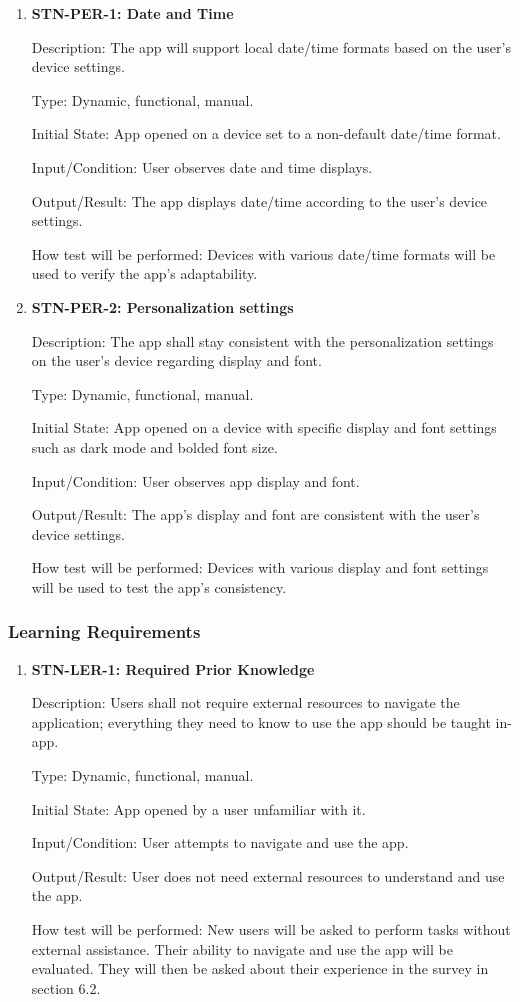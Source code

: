 \documentclass[12pt, titlepage]{article}
\begin{document}
\begin{enumerate}

\item {\textbf{STN-PER-1: Date and Time}}

Description: The app will support local date/time formats based on the user’s device settings.

Type: Dynamic, functional, manual.

Initial State: App opened on a device set to a non-default date/time format.

Input/Condition: User observes date and time displays.

Output/Result: The app displays date/time according to the user's device settings.

How test will be performed: Devices with various date/time formats will be used to verify the app's adaptability.


\item{\textbf{STN-PER-2: Personalization settings}}

Description: The app shall stay consistent with the personalization settings on the user’s device regarding display and font.

Type: Dynamic, functional, manual.

Initial State: App opened on a device with specific display and font settings such as dark mode and bolded font size.

Input/Condition: User observes app display and font.

Output/Result: The app's display and font are consistent with the user’s device settings.

How test will be performed: Devices with various display and font settings will be used to test the app's consistency.

\end{enumerate}

\subsubsection{Learning Requirements}

\begin{enumerate}

\item {\textbf{STN-LER-1: Required Prior Knowledge}}

Description: Users shall not require external resources to navigate the application; everything they need to know to use the app should be taught in-app.

Type: Dynamic, functional, manual.

Initial State: App opened by a user unfamiliar with it.

Input/Condition: User attempts to navigate and use the app.

Output/Result: User does not need external resources to understand and use the app.

How test will be performed: New users will be asked to perform tasks without external assistance. Their ability to navigate and use the app will be evaluated. They will then be asked about their experience in the survey in section 6.2. 

\end{enumerate}
\end{document}
